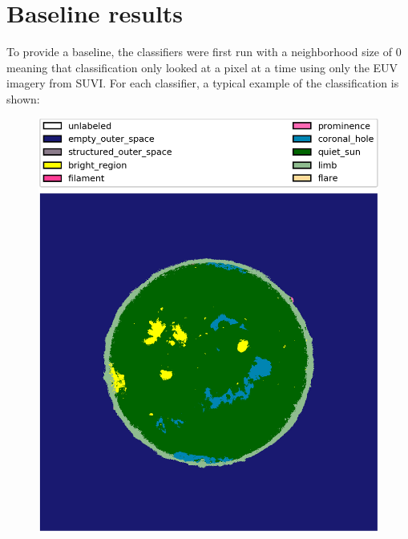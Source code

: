 \documentclass[twoside]{report}
\begin{document}
\section{Baseline results}
To provide a baseline, the classifiers were first run with a neighborhood size of 0 meaning that classification only looked at a pixel at a time using only the EUV imagery from SUVI. For each classifier, a typical example of the classification is shown:

\begin{figure}[ht]
  \begin{center}
    \includegraphics[scale=0.2]{base_rf}

\end{center}
\end{figure}
\end{document}
